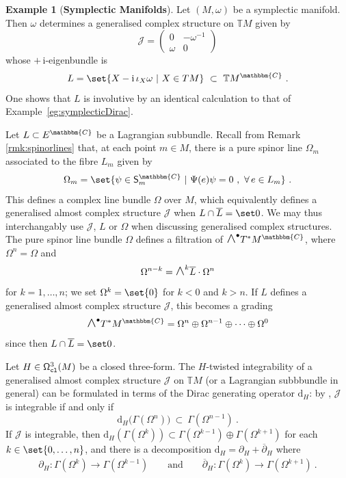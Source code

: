 \documentclass[a4paper, reqno, 11pt]{amsart}
\numberwithin{equation}{section}
\theoremstyle{definition}
\newtheorem{example}[equation]{Example}
\newcommand{\sfgamma}{\mathsf{\Gamma}}
\newcommand{\de}{\mathrm{d}}
\newcommand{\ii}{\mathrm{i}}
\newcommand{\IC}{\mathbbm{C}}
\newcommand{\IT}{\mathbb{T}}
\newcommand{\cJ}{{\mathcal J}}
\newcommand{\sfS}{{\mathsf{S}}}
\newcommand{\sfGamma}{{\mathsf{\Gamma}}}
\newcommand{\sfOmega}{{\mathsf{\Omega}}}
\newcommand{\midwedge}{\text {\Large$\wedge$}}
\theoremstyle{remark}
\begin{document}
\begin{example}[\textbf{Symplectic Manifolds}] \label{ex:symplecticmanifolds}
 Let $(M, \omega)$ be a symplectic manifold. Then $\omega$ determines a generalised complex structure on $\IT M$ given by 
 \begin{equation} \label{eqn:omegacomplex}
 \cJ =
 \begin{pmatrix}
 0 & -\omega^{-1} \\
 \omega & 0
 \end{pmatrix}
\end{equation}
whose $+\,\ii$-eigenbundle is 
\begin{align}
L = \set{X - \ii \, \iota_X \omega \ \vert \ X \in TM} \ \subset \ \IT M^{\IC} \ .    
\end{align}
One shows that $L$ is involutive by an identical calculation to that of Example~\ref{eg:symplecticDirac}.
\end{example}

Let $L\subset E^\IC$ be a Lagrangian subbundle. Recall from Remark \ref{rmk:spinorlines} that, at each point $m \in M$, there is a pure spinor line $\Omega_m$ associated to the fibre $L_m$ given by
\begin{align}
    \Omega_m = \set{\psi \in \sfS_m^\IC \ \vert \ \Psi(e) \psi = 0 \ , \ \forall\, e\in L_m} \ .
\end{align} 
This defines a complex line bundle $\Omega$ over $M$, which equivalently defines a generalised almost complex structure $\cJ$ when $L\cap \overline L = \set 0$. We may thus interchangably use $\cJ$, $L$ or $\Omega$ when discussing generalised complex structures. The pure spinor line bundle $\Omega$ defines a filtration of $\midwedge^\bullet T^*M^\IC$, where $\Omega^{n} = \Omega$ and $$\Omega^{n-k} = \midwedge^k \overline{L} \cdot \Omega^{n}$$ for $k=1,\dots,n$; we set $\Omega^k = \set{0}$ for $k<0$ and $k>n$. If $L$ defines a generalised almost complex structure $\cJ$,  this becomes a grading
\begin{align}\label{eqn:GCSgrading}
    \midwedge^\bullet T^*M^\IC = \Omega^{n} \oplus \Omega^{n-1} \oplus \cdots \oplus \Omega^{0}
\end{align}
since then $L \cap \overline{L} = \set 0$.

Let $H\in\sfOmega_{\tt cl}^3(M)$ be a closed three-form. The $H$-twisted integrability of a generalised almost complex structure $\cJ$ on $\IT M$ (or a Lagrangian subbbundle in general) can be formulated in terms of the Dirac generating operator $\de_H$: by \cite[Theorem 3.38]{gualtieri:tesi}, $\cJ$ is integrable if and only if $$\de_H\big(\sfGamma(\Omega^{n})\big) \ \subset \ \sfgamma(\Omega^{n-1}) \ . $$ If $\cJ$ is integrable, then $\de_H(\sfgamma(\Omega^k)) \subset \sfgamma(\Omega^{k-1}) \oplus \sfgamma(\Omega^{k+1})$ for each $k\in\set{0,\dots,n}$, and there is a decomposition $\de_H = \partial_H + \overline{\partial}_H$ where \cite[Theorem 4.23]{gualtieri:tesi}
\begin{align}
    \partial_H \colon \sfgamma(\Omega^k) \longrightarrow \sfgamma(\Omega^{k-1}) \qquad \text{and} \qquad \overline{\partial}_H \colon \sfgamma(\Omega^k) \longrightarrow \sfgamma(\Omega^{k+1}) \ .
\end{align}
\end{document}

